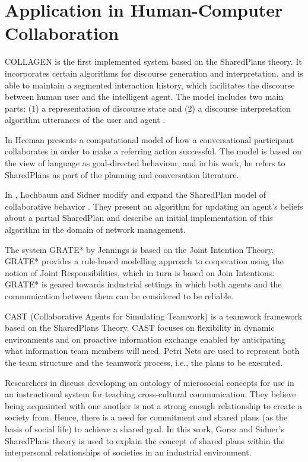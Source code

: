 \documentclass[11pt]{article}
\begin{document}
\section{Application in Human-Computer Collaboration}

COLLAGEN \cite{rich:collaboration-manager,rich:discourse} is the first
implemented system based on the SharedPlans theory. It incorporates certain
algorithms for discourse generation and interpretation, and is able to maintain
a segmented interaction history, which facilitates the discourse between human
user and the intelligent agent. The model includes two main parts: (1) a
representation of discourse state and (2) a discourse interpretation algorithm
utterances of the user and agent \cite{rickel:discourse-theory-dialogue}.

In \cite{heeman:model-collaboration-referring} Heeman presents a computational
model of how a conversational participant collaborates in order to make a
referring action successful. The model is based on the view of language as
goal-directed behaviour, and in his work, he refers to SharedPlans as part of
the planning and conversation literature.

In \cite{lochbaum:plan-models}, Lochbaum and Sidner modify and expand the
SharedPlan model of collaborative behavior \cite{grosz:plans-discourse}. They
present an algorithm for updating an agent’s beliefs about a partial SharedPlan
and describe an initial implementation of this algorithm in the domain of
network management.

The system GRATE* by Jennings \cite{jennings:joint-intention-hybrid} is based on
the Joint Intention Theory. GRATE* provides a rule-based modelling approach to
cooperation using the notion of Joint Responsibilities, which in turn is based
on Join Intentions. GRATE* is geared towards industrial settings in which both
agents and the communication between them can be considered to be reliable.

CAST (Collaborative Agents for Simulating Teamwork) \cite{yen:cast}
\cite{yin:knowledge-based-sharedplans} is a teamwork framework based on the
SharedPlans Theory. CAST focuses on flexibility in dynamic environments and on
proactive information exchange enabled by anticipating what information team
members will need. Petri Nets are used to represent both the team structure and
the teamwork process, i.e., the plans to be executed.

Researchers in \cite{hobbs:microsociology-relationship} discuss developing an
ontology of microsocial concepts for use in an instructional system for teaching
cross-cultural communication. They believe being acquainted with one another is
not a strong enough relationship to create a society from. Hence, there is a
need for commitment and shared plans (as the basis of social life) to achieve a
shared goal. In this work, Gorsz and Sidner's SharedPlans theory
\cite{grosz:plans-discourse} is used to explain the concept of shared plans
within the interpersonal relationships of societies in an industrial
environment.
\end{document}
